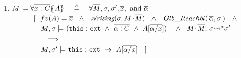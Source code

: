 {{\begin{definition}
\begin{enumerate}
 \item
 $M \models \forall {\overline {x:C}}{{\{}\!\!{\{}}{A}{{\}}\!\!{\}}} \ \  \ \triangleq   \ \ \ \forall   \overline{M},  \sigma, \sigma',  \overline{x}, \mbox{ and }  \overline{\alpha}$    \\
$\strut   \ \ \ \  \  \ \ \ \  [ \ \ { fv(A)=\overline x \  \ \wedge \ \ \arising{\sigma}{M\madd \Mtwo }\   \  \wedge\ \ \GRelevant {\overline \alpha}  \sigma}\ \ \ \wedge \ \  $\\
$\strut    \ \ \ \  \  \ \ \ \ \  \ \ \satisfiesA {M}   {\sigma}  
	{(\external{\prg{this}}  \ \wedge \  \overline {\alpha :C} \ \wedge\  {A[\overline{\alpha/x}]} ) } \ \ \ \wedge \ \  
	{\leadstoBoundedStar {M\madd \Mtwo}{\sigma}  {\sigma'} } $ \\ %
$\strut   \ \ \ \  \  \ \ \ \ \  \ \ \ \  \Longrightarrow   $\\
$\strut   \ \ \ \  \  \ \ \ \ \  \ \  {\satisfiesA{M}{\sigma'}{  \external{\prg{this}}\ \rightarrow\  A[\overline{\alpha/x}]}  }  \ \ \  ]  $

\end{enumerate}
\end{definition}}}

